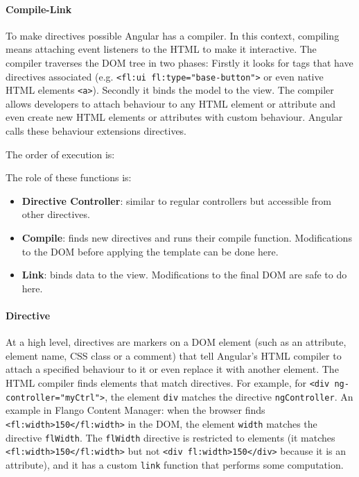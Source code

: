 \paragraph{Compile-Link} To make directives possible Angular has a compiler.
In this context, compiling means attaching event listeners to the \ac{HTML} to make it interactive.
The compiler traverses the \ac{DOM} tree in two phases:
Firstly it looks for tags that have directives associated (e.g. \lstinline$<fl:ui fl:type="base-button">$ or even native \ac{HTML} elements \lstinline$<a>$).
Secondly it binds the model to the view.
The compiler allows developers to attach behaviour to any \ac{HTML} element or attribute and even create new HTML elements or attributes with custom behaviour.
Angular calls these behaviour extensions directives.

The order of execution is:





The role of these functions is:
\begin{itemize}
\item \textbf{Directive Controller}: similar to regular controllers but accessible from other directives. 
\item \textbf{Compile}: finds new directives and runs their compile function. Modifications to the \ac{DOM} before applying the template can be done here.
\item \textbf{Link}: binds data to the view. Modifications to the final \ac{DOM} are safe to do here.
\end{itemize}

\paragraph{Directive} At a high level, directives are markers on a \ac{DOM} element (such as an attribute, element name, \ac{CSS} class or a comment) that tell Angular's \ac{HTML} compiler to attach a specified behaviour to it or even replace it with another element.
The \ac{HTML} compiler finds elements that match directives. 
For example, for \lstinline$<div ng-controller="myCtrl">$, the element \texttt{div} matches the directive \texttt{ngController}.
An example in Flango Content Manager: when the browser finds \lstinline$<fl:width>150</fl:width>$ in the \ac{DOM}, the element \texttt{width} matches the directive \texttt{flWidth}.
The \texttt{flWidth} directive is restricted to elements (it matches \lstinline$<fl:width>150</fl:width>$ but not \lstinline$<div fl:width>150</div>$ because it is an attribute), and it has a custom \texttt{link} function that performs some computation.

